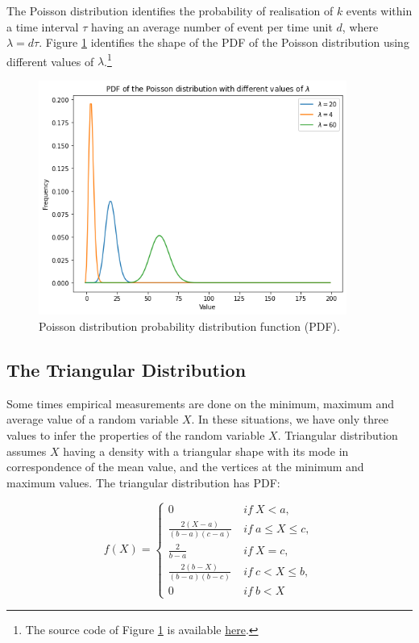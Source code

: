 The Poisson distribution identifies the probability of realisation of $k$ events within a time interval $\tau$ having an average number of event per time unit $d$, where $\lambda=d\tau$. Figure \ref{fig_poisson} identifies the shape of the PDF of the Poisson distribution using different values of $\lambda$.\footnote{The source code of Figure \ref{fig_poisson} is available \href{https://github.com/aletuf93/logproj/blob/master/examples/03.\%20Statistics.ipynb}{here}.
}


\begin{figure}[hbt!]
\centering
\includegraphics[width=0.9\textwidth]{SectionLetsMath/elemStat_figures/fig_poisson.png}
\captionsetup{type=figure}
\caption{Poisson distribution probability distribution function (PDF).}
\label{fig_poisson}
\end{figure}

\subsection{The Triangular Distribution}
Some times empirical measurements are done on the minimum, maximum and average value of a random variable $X$. In these situations, we have only three values to infer the properties of the random variable $X$. Triangular distribution assumes $X$ having a density with a triangular shape with its mode in correspondence of the mean value, and the vertices at the minimum and maximum values. The triangular distribution has PDF:

\begin{equation}
f(X)=\left\{
                \begin{array}{ll}
                  0\ \ & if\ X<a,\\
                  \frac{2(X-a)}{(b-a)(c-a)}\ & if\ a\le X\le c,\\
                  \frac{2}{b-a}\ & if\ X=c,\\
                  \frac{2(b-X)}{(b-a)(b-c)}\ & if\ c<X\le b,\\
                  0\ & if\ b<X
                \end{array}
              \right.
\label{eq_triangularDF}
\end{equation}

